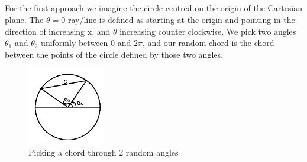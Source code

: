 \documentclass[answers]{exam}
\begin{document}
\subsection{} For the first approach we imagine the circle centred on the origin of the Cartesian plane. The $\theta = 0$ ray/line is defined as starting at the origin and pointing in the direction of increasing x, and $\theta$ increasing counter clockwise. We pick two angles $\theta_1$ and $\theta_2$ uniformly between $0$ and $2\pi$, and our random chord is the chord between the points of the circle defined by those two angles.

\begin{figure}[H] %
    \centering
    \includegraphics[width= 0.3\textwidth]{Q4.1.PNG}
    \caption{Picking a chord through 2 random angles}
\end{figure}
\end{document}
